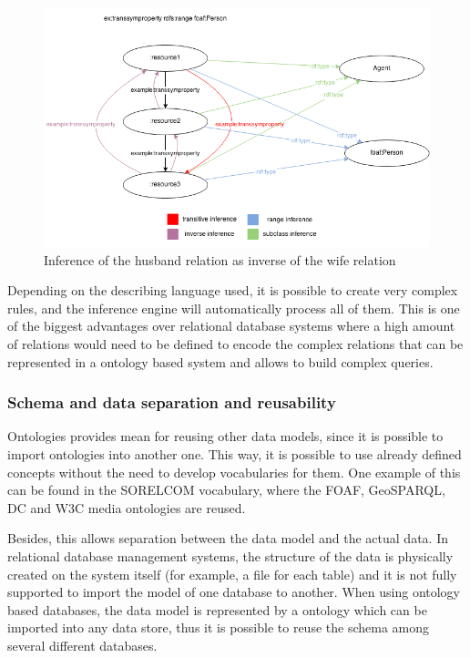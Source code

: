 \begin{figure}[ht]
  \centering
  \includegraphics[width=.9\textwidth]{fig/complex-inference}
  \caption{Inference of the husband relation as inverse of the wife relation}
  \label{fig:complex-inference}
\end{figure}

Depending on the describing language used, it is possible to create very complex rules, and the inference engine will automatically process all of them. This is one of the biggest advantages over relational database systems where a high amount of relations would need to be defined to encode the complex relations that can be represented in a ontology based system and allows to build complex queries.

\subsubsection{Schema and data separation and reusability}

Ontologies provides mean for reusing other data models, since it is possible to import ontologies into another one. This way, it is possible to use already defined concepts without the need to develop vocabularies for them. One example of this can be found in the SORELCOM vocabulary, where the FOAF, GeoSPARQL, DC and W3C media ontologies are reused.

Besides, this allows separation between the data model and the actual data. In relational database management systems, the structure of the data is physically created on the system itself (for example, a file for each table) and it is not fully supported to import the model of one database to another. When using ontology based databases, the data model is represented by a ontology which can be imported into any data store, thus it is possible to reuse the schema among several different databases.

